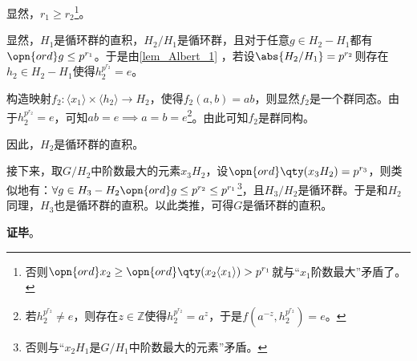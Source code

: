 显然，$r_1\geq r_2$\footnote{否则$\opn{ord}x_2\geq \opn{ord}\qty(x_2\langle x_1 \rangle)>p^{r_1}$就与“$x_1$阶数最大”矛盾了。}。



显然，$H_1$是循环群的直积，$H_2/H_1$是循环群，且对于任意$g\in H_2-H_1$都有$\opn{ord}g\leq p^{r_1}$。于是由\autoref{lem_Albert_1} ，若设$\abs{H_2/H_1}=p^{r_2}$则存在$h_2\in H_2-H_1$使得$h_2^{p^{r_2}}=e$。


构造映射$f_2:\langle x_1 \rangle\times \langle h_2 \rangle\to H_2$，使得$f_2(a, b)=ab$，则显然$f_2$是一个群同态。由于$h_2^{p^{r_2}}=e$，可知$ab=e\implies a=b=e$\footnote{若$h_2^{p^{r_2}}\not=e$，则存在$z\in\mathbb{Z}$使得$h_2^{p^{r_2}}=a^z$，于是$f(a^{-z}, h_2^{p^{r_2}})=e$。}。由此可知$f_2$是群同构。

因此，$H_2$是循环群的直积。

接下来，取$G/H_2$中阶数最大的元素$x_3H_2$，设$\opn{ord}\qty(x_3H_2)=p^{r_3}$，则类似地有：$\forall g\in H_3-H_2 \opn{ord}g\leq p^{r_2}\leq p^{r_1}$\footnote{否则与“$x_2H_1$是$G/H_1$中阶数最大的元素”矛盾。}，且$H_3/H_2$是循环群。于是和$H_2$同理，$H_3$也是循环群的直积。以此类推，可得$G$是循环群的直积。

\textbf{证毕}。
















